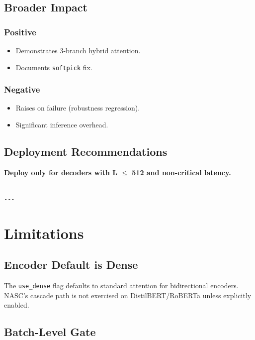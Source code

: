 \subsection{Broader Impact}

\subsubsection{Positive}

\begin{itemize}
\item Demonstrates 3-branch hybrid attention.
\item Documents \texttt{softpick} fix.

\end{itemize}
\subsubsection{Negative}

\begin{itemize}
\item Raises on failure (robustness regression).
\item Significant inference overhead.

\end{itemize}
\subsection{Deployment Recommendations}

\textbf{Deploy only for decoders with L $\le$ 512 and non-critical latency.}
\begin{lstlisting}

---
\end{lstlisting}


\section{Limitations}

\subsection{Encoder Default is Dense}

The \texttt{use\_dense} flag defaults to standard attention for bidirectional 
encoders. NASC's cascade path is not exercised on DistilBERT/RoBERTa 
unless explicitly enabled.

\subsection{Batch-Level Gate}

